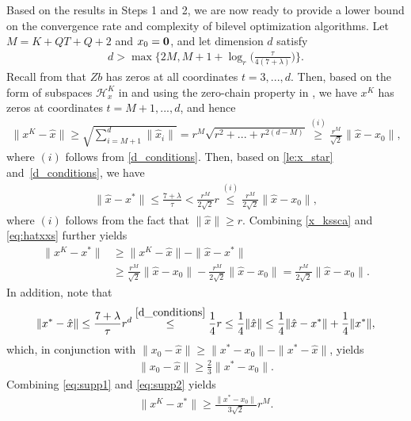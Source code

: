 \documentclass{osudissert96}
\begin{document}
Based on the results in Steps 1 and 2, we are now ready to provide a lower bound on the convergence rate and complexity of bilevel optimization algorithms.  Let $M = K+QT+Q+ 2$ and $x_0 = {\bf 0}$, and  
let  dimension $d$ satisfy 
\begin{align}\label{d_conditions}
d> \max\Big\{2M,M+1+\log_{r}\Big(\frac{\tau}{4(7+\lambda)}\Big)\Big\}.
\end{align}
Recall from  that $Zb$ has zeros at all coordinates $t=3,...,d$. Then, based on the form of subspaces $\mathcal{H}_x^K$ in  and using the zero-chain property in , we have $x^K$ has zeros at coordinates $t=M+1,...,d$, and hence 
\begin{align}\label{x_kssca}
\|x^K-\hat x\| \geq \sqrt{\sum_{i=M+1}^d\|\hat x_i\|}  = r^{M}\sqrt{r^2+...+r^{2(d-M)}} \overset{(i)}\geq \frac{r^M}{\sqrt{2}}\|\hat x -x_0\|,
\end{align}
where $(i)$ follows from \cref{d_conditions}. Then, based on \cref{le:x_star} and~\cref{d_conditions}, we have 
\begin{align}\label{eq:hatxxs}
\|\hat x - x^*\| \leq \frac{7+\lambda}{\tau} < \frac{r^M}{2\sqrt{2}} r \overset{(i)}\leq \frac{r^M}{2\sqrt{2}} \|\hat x-x_0\|, 
\end{align}
where $(i)$ follows from the fact that $\|\hat x\| \geq r$. Combining \cref{x_kssca} and \cref{eq:hatxxs} further yields 
\begin{align}\label{eq:supp1}
\|x^K-x^*\| &\geq \|x^K-\hat x\| - \|\hat x - x^*\|  \nonumber
\\&\geq \frac{r^M}{\sqrt{2}} \|\hat x -x_0\| - \frac{r^M}{2\sqrt{2}}\|\hat x-x_0\| =\frac{r^M}{2\sqrt{2}}\|\hat x-x_0\|.
\end{align}
In addition,  note that 
\begin{align*}
\|x^* -\hat x\| \leq \frac{7+\lambda}{\tau} r^d  \overset{\eqref{d_conditions}}\leq \frac{1}{4} r \leq \frac{1}{4}\|\hat x\| \leq \frac{1}{4}\|\hat x - x^*\| +\frac{1}{4} \|x^*\|,
\end{align*}
which, in conjunction with $\|x_0-\hat x\|\geq \|x^*-x_0\| - \|x^*-\hat x\|$, yields
\begin{align}\label{eq:supp2}
\|x_0-\hat x\|\geq \frac{2}{3} \|x^*-x_0\|.
\end{align}
Combining \cref{eq:supp1} and \cref{eq:supp2} yields 
\begin{align}\label{x_lowbound}
\|x^K-x^*\| \geq \frac{\|x^*-x_0\|}{3\sqrt{2}} r^M.
\end{align}
\end{document}
